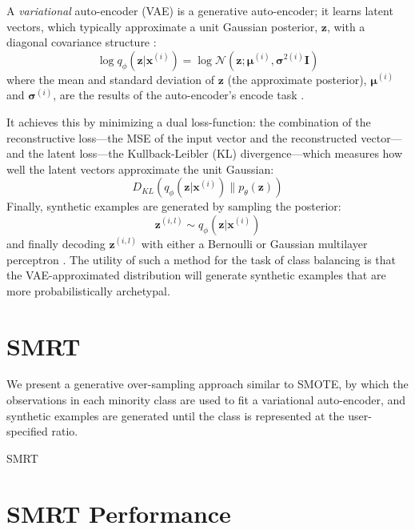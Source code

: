 \documentclass[twoside,11pt]{article}
\begin{document}
A \emph{variational} auto-encoder (VAE) is a generative auto-encoder; it learns latent vectors, which typically approximate a unit Gaussian posterior, $\mathbf{z}$, with a diagonal covariance structure \citep{kingma2013auto}:
\[
    \log q_{\phi}(\mathbf{z}|\mathbf{x}^{(i)}) = \log \mathcal{N}(\mathbf{z}; \bm{\mu}^{(i)}, \bm{\sigma}^{2(i)}\mathbf{I})
\]
where the mean and standard deviation of $\mathbf{z}$ (the approximate posterior), $\bm{\mu}^{(i)}$ and $\bm{\sigma}^{(i)}$, are the results of the auto-encoder's encode task \citep{kingma2013auto}.

It achieves this by minimizing a dual loss-function: the combination of the reconstructive loss---the MSE of the input vector and the reconstructed vector---and the latent loss---the Kullback-Leibler (KL) divergence---which measures how well the latent vectors approximate the unit Gaussian:
\[
    D_{KL}(q_{\phi}(\mathbf{z}|\mathbf{x}^{(i)})\parallel p_{\theta}(\mathbf{z}))
\]
Finally, synthetic examples are generated by sampling the posterior:
\[
    \mathbf{z}^{(i,l)} \sim q_{\phi}(\mathbf{z}|\mathbf{x}^{(i)})
\]
and finally decoding $\mathbf{z}^{(i,l)}$ with either a Bernoulli or Gaussian multilayer perceptron \citep{kingma2013auto}. The utility of such a method for the task of class balancing is that the VAE-approximated distribution will generate synthetic examples that are more probabilistically archetypal.


\section{SMRT}

We present a generative over-sampling approach similar to SMOTE, by which the observations in each minority class are used to fit a variational auto-encoder, and synthetic examples are generated until the class is represented at the user-specified ratio. \\

\makeatletter
\def\BState{\State\hskip-\ALG@thistlm}
\makeatother

\begin{algorithm}
\caption{SMRT}\label{smrt}
\end{algorithm}

\section{SMRT Performance}


\newpage

\end{document}
